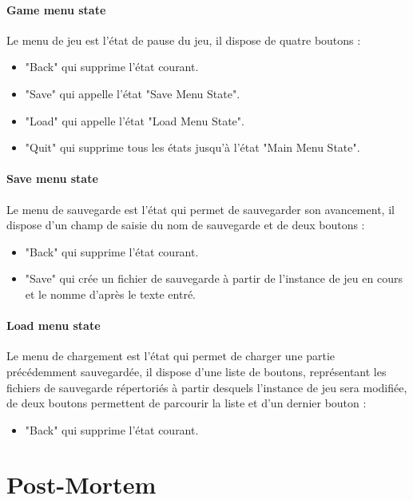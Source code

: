 \documentclass[a4paper]{memoir}
\begin{document}
				\subsubsection{Game menu state}
					Le menu de jeu est l’état de pause du jeu, il dispose de quatre boutons :
					\begin{itemize}[label=$\bullet$]
						\item "Back" qui supprime l’état courant.
						\item "Save" qui appelle l’état "Save Menu State".
						\item "Load" qui appelle l’état "Load Menu State".
						\item "Quit" qui supprime tous les états jusqu’à l’état "Main Menu State".
					\end{itemize}
					
				\subsubsection{Save menu state}
					Le menu de sauvegarde est l’état qui permet de sauvegarder son avancement, il dispose d’un champ de saisie du nom de sauvegarde et de deux boutons :
					\begin{itemize}[label=$\bullet$]
						\item "Back" qui supprime l’état courant.
						\item "Save" qui crée un fichier de sauvegarde à partir de l’instance de jeu en cours et le nomme d’après le texte entré.
					\end{itemize}
					
				\subsubsection{Load menu state}
					Le menu de chargement est l’état qui permet de charger une partie précédemment sauvegardée, il dispose d’une liste de boutons, représentant les fichiers de sauvegarde répertoriés à partir desquels l’instance de jeu sera modifiée, de deux boutons permettent de parcourir la liste et d’un dernier bouton :
					\begin{itemize}[label=$\bullet$]
						\item "Back" qui supprime l’état courant.
					\end{itemize}
			
	\chapter{Post-Mortem}
	
\end{document}
